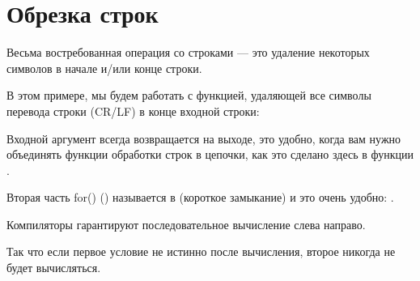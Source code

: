\section{Обрезка строк}
\newcommand{\CRLF}{\ac{CR}/\ac{LF}}

Весьма востребованная операция со строками --- это удаление некоторых символов в начале и/или конце
строки.

В этом примере, мы будем работать с функцией, удаляющей все символы перевода строки 
(\CRLF{}) в конце входной строки:



Входной аргумент всегда возвращается на выходе, это удобно, когда вам нужно объединять
функции обработки строк в цепочки, как это сделано здесь в функции \main.

Вторая часть for() () называется в \CCpp {} 
(короткое замыкание) и это очень удобно: .

Компиляторы \CCpp гарантируют последовательное вычисление слева направо.

Так что если первое условие не истинно после вычисления, второе никогда не будет
вычисляться.






